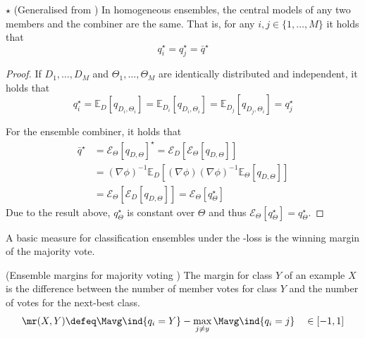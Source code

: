 \documentclass[
	twoside=false, %
]{kaobook}
\begin{document}
\begin{lemma}
 \label{thm:qstars-same} 
  $\star$ (Generalised from \cite{louppe_UnderstandingRandomForests_2015}) In homogeneous ensembles, the central models of any two members and the combiner are the same. That is, for any $i, j \in \{ 1, \dots, M \}$ it holds that
$$
q_{i}^\star = q_{j}^\star = \bar{q}^\star
$$
\end{lemma}
\begin{proof}
If $D_{1}, \dots, D_{M}$ and $\Theta_{1}, \dots, \Theta_{M}$ are identically distributed and independent, it holds that
$$
q_{i}^\star = \mathbb{E}_{D}\left[ q_{D_{i}, \Theta_{i}} \right]  = \mathbb{E}_{D_{i}}\left[ q_{D_{i}, \Theta_{i}} \right]  
= \mathbb{E}_{D_{j}}\left[ q_{D_{j}, \Theta_{i}} \right] = q_{j}^\star
$$

For the ensemble combiner, it holds that
\begin{align*}
\bar{q}^\star &= \mathcal{E}_{\Theta}\left[ q_{D,\Theta} \right] ^\star = \mathcal{E}_{D}\left[ \mathcal{E}_{\Theta}\left[ q_{D,\Theta} \right]   \right] \\
&= (\nabla \phi)^{-1} \mathbb{E}_{D}\left[ (\nabla \phi) (\nabla \phi)^{-1} \mathbb{E}_{\Theta}\left[ q_{D,\Theta} \right]   \right] \\
&= \mathcal{E}_{\Theta}\left[ \mathcal{E}_{D}\left[ q_{D, \Theta} \right]  \right] = \mathcal{E}_{\Theta}\left[ q_{\Theta}^\star \right] 
\end{align*}
Due to the result above, $q_{\Theta}^\star$ is constant over $\Theta$ and thus $\mathcal{E}_{\Theta}\left[ q_{\Theta}^\star \right] = q_{\Theta}^\star$.
\end{proof}

A basic measure for classification ensembles under the \zeroone-loss is the winning margin of the majority vote.
\begin{definition} (Ensemble margins for majority voting \cite{breiman_RandomForests_2001})
The margin for class $Y$ of an example $X$ is the difference between the number of member votes for class $Y$ and the number of votes for the next-best class.
	$$
\mr(X,Y) \defeq \Mavg \ind{q_{i} = Y} - \max_{j \neq y} \Mavg \ind{q_{i} = j} \hspace{1em} \in [-1, 1]
$$
\label{def:ensemble-margin}
\end{definition}
\end{document}
